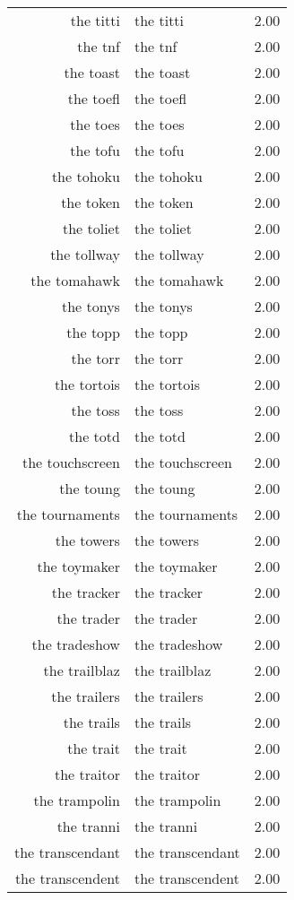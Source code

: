 \begin{table}[ht]
\begin{tabular}{rlr}
  the titti & the titti & 2.00 \\ 
  the tnf & the tnf & 2.00 \\ 
  the toast & the toast & 2.00 \\ 
  the toefl & the toefl & 2.00 \\ 
  the toes & the toes & 2.00 \\ 
  the tofu & the tofu & 2.00 \\ 
  the tohoku & the tohoku & 2.00 \\ 
  the token & the token & 2.00 \\ 
  the toliet & the toliet & 2.00 \\ 
  the tollway & the tollway & 2.00 \\ 
  the tomahawk & the tomahawk & 2.00 \\ 
  the tonys & the tonys & 2.00 \\ 
  the topp & the topp & 2.00 \\ 
  the torr & the torr & 2.00 \\ 
  the tortois & the tortois & 2.00 \\ 
  the toss & the toss & 2.00 \\ 
  the totd & the totd & 2.00 \\ 
  the touchscreen & the touchscreen & 2.00 \\ 
  the toung & the toung & 2.00 \\ 
  the tournaments & the tournaments & 2.00 \\ 
  the towers & the towers & 2.00 \\ 
  the toymaker & the toymaker & 2.00 \\ 
  the tracker & the tracker & 2.00 \\ 
  the trader & the trader & 2.00 \\ 
  the tradeshow & the tradeshow & 2.00 \\ 
  the trailblaz & the trailblaz & 2.00 \\ 
  the trailers & the trailers & 2.00 \\ 
  the trails & the trails & 2.00 \\ 
  the trait & the trait & 2.00 \\ 
  the traitor & the traitor & 2.00 \\ 
  the trampolin & the trampolin & 2.00 \\ 
  the tranni & the tranni & 2.00 \\ 
  the transcendant & the transcendant & 2.00 \\ 
  the transcendent & the transcendent & 2.00 \\ 

\end{tabular}
\end{table}
